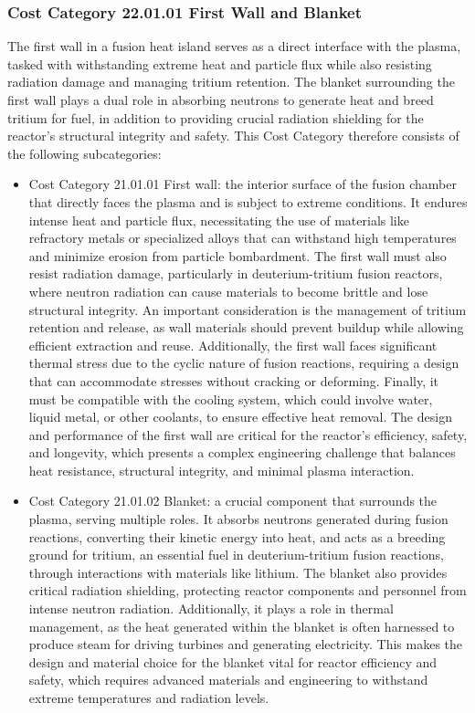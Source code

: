 \subsubsection*{Cost Category 22.01.01 First Wall and Blanket} 

The first wall in a fusion heat island serves as a direct interface with the plasma, tasked with withstanding extreme heat and particle flux while also resisting radiation damage and managing tritium retention. The blanket surrounding the first wall plays a dual role in absorbing neutrons to generate heat and breed tritium for fuel, in addition to providing crucial radiation shielding for the reactor's structural integrity and safety.  This Cost Category therefore consists of the following subcategories:


\begin{itemize}
    \item Cost Category 21.01.01 First wall: the interior surface of the fusion chamber that directly faces the plasma and is subject to extreme conditions. It endures intense heat and particle flux, necessitating the use of materials like refractory metals or specialized alloys that can withstand high temperatures and minimize erosion from particle bombardment. The first wall must also resist radiation damage, particularly in deuterium-tritium fusion reactors, where neutron radiation can cause materials to become brittle and lose structural integrity. An important consideration is the management of tritium retention and release, as wall materials should prevent buildup while allowing efficient extraction and reuse. Additionally, the first wall faces significant thermal stress due to the cyclic nature of fusion reactions, requiring a design that can accommodate stresses without cracking or deforming. Finally, it must be compatible with the cooling system, which could involve water, liquid metal, or other coolants, to ensure effective heat removal. The design and performance of the first wall are critical for the reactor's efficiency, safety, and longevity, which presents a complex engineering challenge that balances heat resistance, structural integrity, and minimal plasma interaction.
    \item Cost Category 21.01.02 Blanket: a crucial component that surrounds the plasma, serving multiple roles. It absorbs neutrons generated during fusion reactions, converting their kinetic energy into heat, and acts as a breeding ground for tritium, an essential fuel in deuterium-tritium fusion reactions, through interactions with materials like lithium. The blanket also provides critical radiation shielding, protecting reactor components and personnel from intense neutron radiation. Additionally, it plays a role in thermal management, as the heat generated within the blanket is often harnessed to produce steam for driving turbines and generating electricity. This makes the design and material choice for the blanket vital for reactor efficiency and safety, which requires advanced materials and engineering to withstand extreme temperatures and radiation levels.
\end{itemize}

